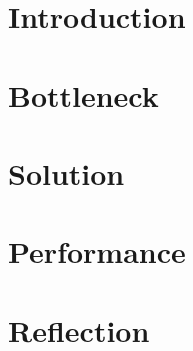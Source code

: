 \documentclass[a4paper]{article}
\begin{document}
\maketitle

\section{Introduction}

\section{Bottleneck}

\section{Solution}

\section{Performance}

\section{Reflection}
\end{document}
